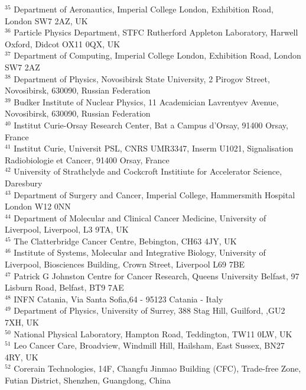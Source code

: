 {\begin{tabbing}
     $^{35}$ \> Department of Aeronautics, Imperial College London, Exhibition Road, London SW7 2AZ, UK\\
     $^{36}$ \> Particle Physics Department, STFC Rutherford Appleton Laboratory, Harwell Oxford, Didcot OX11 0QX, UK\\
     $^{37}$ \> Department of Computing, Imperial College London, Exhibition Road, London SW7 2AZ\\
     $^{38}$ \> Department of Physics, Novosibirsk State University, 2 Pirogov Street, Novosibirsk, 630090, Russian Federation\\
     $^{39}$ \> Budker Institute of Nuclear Physics, 11 Academician Lavrentyev Avenue, Novosibirsk, 630090, Russian Federation\\
     $^{40}$ \> Institut Curie-Orsay Research Center, Bat a Campus d'Orsay, 91400 Orsay, France\\
     $^{41}$ \> Institut Curie, Universit PSL, CNRS UMR3347, Inserm U1021, Signalisation Radiobiologie et Cancer, 91400 Orsay, France\\
     $^{42}$ \> University of Strathclyde and Cockcroft Institiute for Accelerator Science, Daresbury\\
     $^{43}$ \> Department of Surgery and Cancer, Imperial College, Hammersmith Hospital London W12 0NN\\
     $^{44}$ \> Department of Molecular and Clinical Cancer Medicine, University of Liverpool, Liverpool, L3 9TA, UK\\
     $^{45}$ \> The Clatterbridge Cancer Centre, Bebington, CH63 4JY, UK\\
     $^{46}$ \> Institute of Systems, Molecular and Integrative Biology, University of Liverpool, Biosciences Building, Crown Street, Liverpool L69 7BE\\
     $^{47}$ \> Patrick G Johnston Centre for Cancer Research, Queens University Belfast, 97 Lisburn Road, Belfast, BT9 7AE\\
     $^{48}$ \> INFN Catania, Via Santa Sofia,64 - 95123 Catania - Italy\\
     $^{49}$ \> Department of Physics, University of Surrey, 388 Stag Hill, Guilford, ,GU2 7XH, UK\\
     $^{50}$ \> National Physical Laboratory, Hampton Road, Teddington, TW11 0LW, UK\\
     $^{51}$ \> Leo Cancer Care, Broadview, Windmill Hill, Hailsham, East Sussex, BN27 4RY, UK\\
     $^{52}$ \> Corerain Technologies, 14F, Changfu Jinmao Building (CFC), Trade-free Zone, Futian District, Shenzhen, Guangdong, China\\
    ~   \> \\
  \end{tabbing}
}
